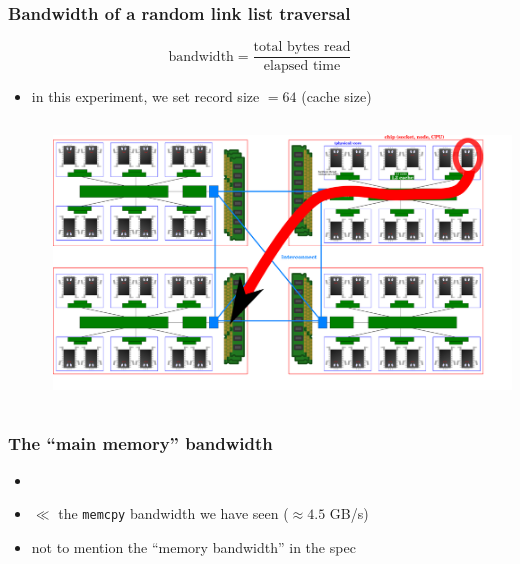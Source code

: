 \documentclass[12pt,dvipdfmx]{beamer}
\begin{document}
\begin{frame}
\frametitle{Bandwidth of a random link list traversal}
\[ \mbox{bandwidth} = \frac{\mbox{total bytes read}}{\mbox{elapsed time}} \]
\begin{itemize}
\item in this experiment, we set record size $= 64$ (cache size)
\begin{columns}
\begin{column}{0.75\textwidth}
  {\scriptsize}
  
\end{column}
\begin{column}{0.25\textwidth}
\includegraphics[width=\textwidth]{out/pdf/svg/diagram_multisocket_remote.pdf}
\end{column}
\end{columns}
\end{itemize}
\end{frame}

\begin{frame}
\frametitle{The ``main memory'' bandwidth}
\begin{itemize}
\item []
  {\scriptsize}
\item $\ll$ the \texttt{memcpy} bandwidth we have seen ($\approx 4.5$ GB/s)
\item not to mention the ``memory bandwidth'' in the spec
\end{itemize}
\end{frame}
\end{document}
